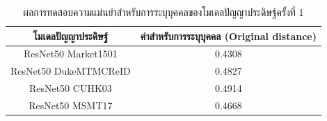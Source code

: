 \begin{table}[!ht]
    \centering
    \begin{tabular}{|c|c|}
        \hline
        {โมเดลปัญญาประดิษฐ์}&{ค่าสำหรับการระบุบุคคล (Original distance)}							\\
        \hline
        ResNet50 Market1501	 			& 0.4308								\\
        ResNet50 DukeMTMCReID			& 0.4827								\\
        ResNet50 CUHK03				& 0.4914								\\
        ResNet50 MSMT17				& 0.4668								\\
        \hline
    \end{tabular}
    \caption{ผลการทดสอบความแม่นยำสำหรับการระบุบุคคลของโมเดลปัญญาประดิษฐ์ครั้งที่ 1}
    \label{tab: Original distant of image 1}
\end{table}
\clearpage
